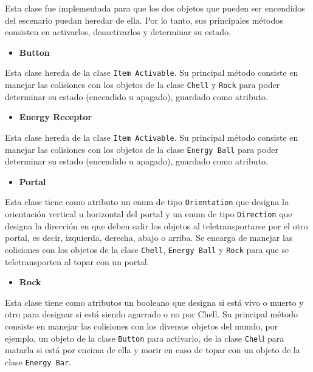 \documentclass[a4paper]{article}
\begin{document}
Esta clase fue implementada para que los dos objetos que pueden ser encendidos del escenario puedan heredar de ella. Por lo tanto, sus principales métodos consisten en activarlos, desactivarlos y determinar su estado.

\begin{itemize}
	\item \textbf{Button}
\end{itemize}

Esta clase hereda de la clase \texttt{Item Activable}. Su principal método consiste en manejar las colisiones con los objetos de la clase \texttt{Chell} y \texttt{Rock} para poder determinar su estado (encendido u apagado), guardado como atributo.

\begin{itemize}
	\item \textbf{Energy Receptor}
\end{itemize}

Esta clase hereda de la clase \texttt{Item Activable}. Su principal método consiste en manejar las colisiones con los objetos de la clase \texttt{Energy Ball} para poder determinar su estado (encendido u apagado), guardado como atributo.

\begin{itemize}
	\item \textbf{Portal}
\end{itemize}

Esta clase tiene como atributo un enum de tipo \texttt{Orientation} que designa la orientación vertical u horizontal del portal y un enum de tipo \texttt{Direction} que designa la dirección en que deben salir los objetos al teletransportarse por el otro portal, es decir, izquierda, derecha, abajo o arriba. Se encarga de manejar las colisiones con los objetos de la clase \texttt{Chell}, \texttt{Energy Ball} y \texttt{Rock} para que se teletransporten al topar con un portal.

\begin{itemize}
	\item \textbf{Rock}
\end{itemize}

Esta clase tiene como atributos un booleano que designa si está vivo o muerto y otro para designar si está siendo agarrado o no por Chell. Su principal método consiste en manejar las colisiones con los diversos objetos del mundo, por ejemplo, un objeto de la clase \texttt{Button} para activarlo, de la clase \texttt{Chel}l para matarla si está por encima de ella y morir en caso de topar con un objeto de la clase \texttt{Energy Bar}.
\end{document}
